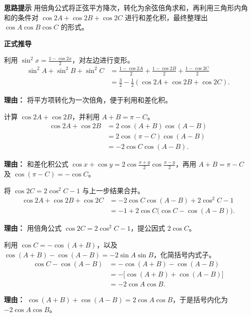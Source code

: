 \begin{proofbox}
\textbf{\textcolor{CProof}{思路提示}} 用倍角公式将正弦平方降次，转化为余弦倍角求和，再利用三角形内角和的条件对 $\cos 2A+\cos 2B+\cos 2C$ 进行和差化积，最终整理出 $\cos A\cos B\cos C$ 的形式。

\medskip
\textbf{\textcolor{CProof}{正式推导}}
\begin{description}[style=nextline, leftmargin=2.8em, labelsep=0.5em, itemsep=0.55em]
    \item[\textbf{步骤一（降次倍角）：}] 利用 $\sin^2 x = \frac{1-\cos 2x}{2}$，对左边进行变形。
    \[
    \begin{aligned}
    \sin^2 A+\sin^2 B+\sin^2 C &= \frac{1-\cos 2A}{2} + \frac{1-\cos 2B}{2} + \frac{1-\cos 2C}{2} \\
    &= \frac{3}{2} - \frac{1}{2}(\cos 2A+\cos 2B+\cos 2C).
    \end{aligned}
    \]
    \par\textbf{理由：} 将平方项转化为一次倍角，便于利用和差化积。

    \item[\textbf{步骤二（和差化积）：}] 计算 $\cos 2A+\cos 2B$，并利用 $A+B=\pi-C$。
    \[
    \begin{aligned}
    \cos 2A + \cos 2B &= 2\cos(A+B)\cos(A-B) \\
    &= 2\cos(\pi-C)\cos(A-B) \\
    &= -2\cos C \cos(A-B).
    \end{aligned}
    \]
    \par\textbf{理由：} 和差化积公式 $\cos x+\cos y = 2\cos\frac{x+y}{2}\cos\frac{x-y}{2}$，再用 $A+B=\pi-C$ 及 $\cos(\pi-C)=-\cos C$。

    \item[\textbf{步骤三（加入第三项）：}] 将 $\cos 2C = 2\cos^2 C - 1$ 与上一步结果合并。
    \[
    \begin{aligned}
    \cos 2A+\cos 2B+\cos 2C &= -2\cos C\cos(A-B) + 2\cos^2 C - 1 \\
    &= -1 + 2\cos C\bigl(\cos C - \cos(A-B)\bigr).
    \end{aligned}
    \]
    \par\textbf{理由：} 用倍角公式 $\cos 2C = 2\cos^2 C -1$，提公因式 $2\cos C$。

    \item[\textbf{步骤四（再化和差）：}] 利用 $\cos C = -\cos(A+B)$，以及 $\cos(A+B) - \cos(A-B) = -2\sin A\sin B$，化简括号内式子。
    \[
    \begin{aligned}
    \cos C - \cos(A-B) &= -\cos(A+B) - \cos(A-B) \\
    &= -\bigl[\cos(A+B)+\cos(A-B)\bigr] \\
    &= -2\cos A\cos B.
    \end{aligned}
    \]
    \par\textbf{理由：} $\cos(A+B)+\cos(A-B)=2\cos A\cos B$，于是括号内化为 $-2\cos A\cos B$。


\end{description}
\end{proofbox}
